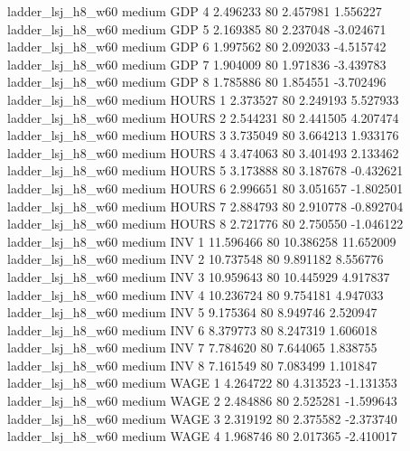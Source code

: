   ladder_lsj_h8_w60     medium      GDP                 4  2.496233 80       2.457981           1.556227
  ladder_lsj_h8_w60     medium      GDP                 5  2.169385 80       2.237048          -3.024671
  ladder_lsj_h8_w60     medium      GDP                 6  1.997562 80       2.092033          -4.515742
  ladder_lsj_h8_w60     medium      GDP                 7  1.904009 80       1.971836          -3.439783
  ladder_lsj_h8_w60     medium      GDP                 8  1.785886 80       1.854551          -3.702496
  ladder_lsj_h8_w60     medium    HOURS                 1  2.373527 80       2.249193           5.527933
  ladder_lsj_h8_w60     medium    HOURS                 2  2.544231 80       2.441505           4.207474
  ladder_lsj_h8_w60     medium    HOURS                 3  3.735049 80       3.664213           1.933176
  ladder_lsj_h8_w60     medium    HOURS                 4  3.474063 80       3.401493           2.133462
  ladder_lsj_h8_w60     medium    HOURS                 5  3.173888 80       3.187678          -0.432621
  ladder_lsj_h8_w60     medium    HOURS                 6  2.996651 80       3.051657          -1.802501
  ladder_lsj_h8_w60     medium    HOURS                 7  2.884793 80       2.910778          -0.892704
  ladder_lsj_h8_w60     medium    HOURS                 8  2.721776 80       2.750550          -1.046122
  ladder_lsj_h8_w60     medium      INV                 1 11.596466 80      10.386258          11.652009
  ladder_lsj_h8_w60     medium      INV                 2 10.737548 80       9.891182           8.556776
  ladder_lsj_h8_w60     medium      INV                 3 10.959643 80      10.445929           4.917837
  ladder_lsj_h8_w60     medium      INV                 4 10.236724 80       9.754181           4.947033
  ladder_lsj_h8_w60     medium      INV                 5  9.175364 80       8.949746           2.520947
  ladder_lsj_h8_w60     medium      INV                 6  8.379773 80       8.247319           1.606018
  ladder_lsj_h8_w60     medium      INV                 7  7.784620 80       7.644065           1.838755
  ladder_lsj_h8_w60     medium      INV                 8  7.161549 80       7.083499           1.101847
  ladder_lsj_h8_w60     medium     WAGE                 1  4.264722 80       4.313523          -1.131353
  ladder_lsj_h8_w60     medium     WAGE                 2  2.484886 80       2.525281          -1.599643
  ladder_lsj_h8_w60     medium     WAGE                 3  2.319192 80       2.375582          -2.373740
  ladder_lsj_h8_w60     medium     WAGE                 4  1.968746 80       2.017365          -2.410017
